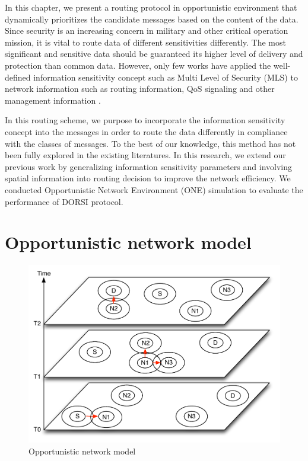 In this chapter, we present a routing protocol in opportunistic environment that dynamically prioritizes the candidate messages based on the content of the data. Since security is an increasing concern in military and other critical operation mission, it is vital to route data of different sensitivities differently. The most significant and sensitive data should be guaranteed its higher level of delivery and protection than common data. However, only few works have applied the well-defined information sensitivity concept such as Multi Level of Security (MLS) \cite{Kotrappa2010,marking2010} to network information such as routing information, QoS signaling and other management information \cite{Winjum2008}.

In this routing scheme, we purpose to incorporate the information sensitivity concept into the messages in order to route the data differently in compliance with the classes of messages. To the best of our knowledge, this method has not been fully explored in the existing literatures. In this research, we extend our previous work \cite{Kerdsri2012} by generalizing information sensitivity parameters and involving spatial information into routing decision to improve the network efficiency. We conducted Opportunistic Network Environment (ONE) simulation \cite{Keranen2009b} to evaluate the performance of DORSI protocol.
\section{Opportunistic network model}
\label{DORSI:Opportunistic network model}

\begin{figure}[!t]
\centering
\includegraphics[width=5in]{Figures/OpportunisticNetworkNodel.pdf}
\caption{Opportunistic network model}
\label{Opportunistic network model}
\end{figure}

